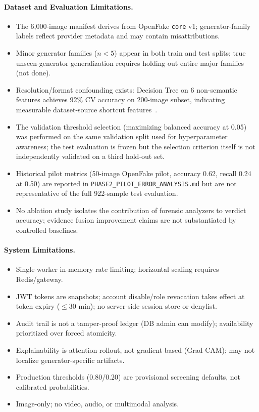 \documentclass[10pt,conference,compsoc]{IEEEtran}
\begin{document}
\paragraph{Dataset and Evaluation Limitations.}
\begin{itemize}
  \item The 6,000-image manifest derives from OpenFake \texttt{core} v1; generator-family labels reflect provider metadata and may contain misattributions.
  \item Minor generator families ($n < 5$) appear in both train and test splits; true unseen-generator generalization requires holding out entire major families (not done).
  \item Resolution/format confounding exists: Decision Tree on 6 non-semantic features achieves 92\% CV accuracy on 200-image subset, indicating measurable dataset-source shortcut features~\cite{experiment-e2-decision}.
  \item The validation threshold selection (maximizing balanced accuracy at 0.05) was performed on the same validation split used for hyperparameter awareness; the test evaluation is frozen but the selection criterion itself is not independently validated on a third hold-out set.
  \item Historical pilot metrics (50-image OpenFake pilot, accuracy 0.62, recall 0.24 at 0.50) are reported in \texttt{PHASE2\_PILOT\_ERROR\_ANALYSIS.md} but are not representative of the full 922-sample test evaluation.
  \item No ablation study isolates the contribution of forensic analyzers to verdict accuracy; evidence fusion improvement claims are not substantiated by controlled baselines.
\end{itemize}

\paragraph{System Limitations.}
\begin{itemize}
  \item Single-worker in-memory rate limiting; horizontal scaling requires Redis/gateway.
  \item JWT tokens are snapshots; account disable/role revocation takes effect at token expiry ($\le$30 min); no server-side session store or denylist.
  \item Audit trail is not a tamper-proof ledger (DB admin can modify); availability prioritized over forced atomicity.
  \item Explainability is attention rollout, not gradient-based (Grad-CAM); may not localize generator-specific artifacts.
  \item Production thresholds (0.80/0.20) are provisional screening defaults, not calibrated probabilities.
  \item Image-only; no video, audio, or multimodal analysis.
\end{itemize}
\end{document}
